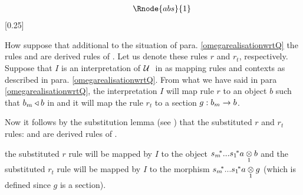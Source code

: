 \begin{oldtt}
\begin{displaymath}
\begin{array}{c p{1cm} c p {1cm} c  p{1cm} c}
																								&&                                           && \Rnode{abs}{1} \ \ \ \ \ \ \ \ &&    
\end{array}
\end{displaymath}
[0.25]

\note 
How suppose that additional to the situation of para. \ref{omegarealisationwrtQ} the rules 
 and   are derived rules of \gatUw. 
Let us denote these rules $r$ and $r_t$, respectively. Suppose that $I$ is an interpretation of $\gatUw$ in \catcw as mapping rules and contexts as described in para. \ref{omegarealisationwrtQ}.
From what we have said in para \ref{omegarealisationwrtQ}, the interpretation  $I$ will map rule $r$ to an object $b$ such that ${b_m \base b}$ in \catcw and it will map the rule $r_t$ to a section $g:b_m \morph b$.  

Now it follows by the substitution lemma (see \cite{Cartmell86})
that the substituted $r$ and $r_t$ rules: 
and   are derived rules of \gatU. 

the substituted $r$ rule will be mapped by $I$ to the object $\smstar...\sonestar\crossx{a}{b}{1}$ and the substituted $r_t$ rule will
be mapped by $I$ to the morphism  $\smstar...\sonestar\crossx{a}{g}{1}$ (which is defined since $g$ is a section).
\end{oldtt}
